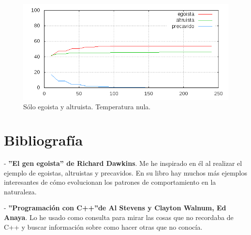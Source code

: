 \documentclass[a4paper,10pt,twocolumn]{article}
\begin{document}
\begin{figure}
\includegraphics[scale=0.4]{p-0-1-0-2estados.png}
\caption{S\'olo egoista y altruista. Temperatura nula.}
\end{figure}

\newpage
\newpage
\section*{Bibliograf\'ia}
- \textbf{''El gen egoista'' de Richard Dawkins}. Me he inspirado en \'el al realizar el ejemplo de egoistas, altruistas y precavidos. En su libro hay muchos m\'as ejemplos interesantes de c\'omo evolucionan los patrones de comportamiento en la naturaleza.

- \textbf{''Programaci\'on con C++''de  Al Stevens y Clayton Walnum, Ed Anaya}. Lo he usado como consulta para mirar las cosas que no recordaba de C++ y buscar informaci\'on sobre como hacer otras que no conoc\'ia.  
\end{document}
